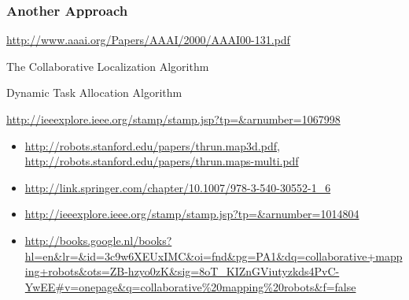 \subsubsection{Another Approach}
\url{http://www.aaai.org/Papers/AAAI/2000/AAAI00-131.pdf}

The Collaborative Localization Algorithm

Dynamic Task Allocation Algorithm

\url{http://ieeexplore.ieee.org/stamp/stamp.jsp?tp=&arnumber=1067998}


\begin{itemize}
  \item \url{http://robots.stanford.edu/papers/thrun.map3d.pdf}, \url{http://robots.stanford.edu/papers/thrun.maps-multi.pdf}
  \item \url{http://link.springer.com/chapter/10.1007/978-3-540-30552-1_6}
  \item \url{http://ieeexplore.ieee.org/stamp/stamp.jsp?tp=&arnumber=1014804}
  \item \url{http://books.google.nl/books?hl=en&lr=&id=3c9w6XEUxIMC&oi=fnd&pg=PA1&dq=collaborative+mapping+robots&ots=ZB-hzyo0zK&sig=8oT_KIZnGViutyzkds4PvC-YwEE#v=onepage&q=collaborative%20mapping%20robots&f=false}
\end{itemize}

  \begin{table}[H]
  \renewcommand{\arraystretch}{1.3}
  \label{table_alg_mapping}
  \caption{Overview of Common Mapping Algorithms}
  \centering
{}
  \end{table}

